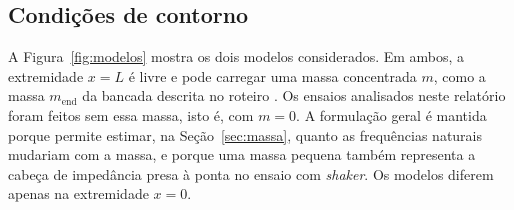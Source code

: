 \subsection{Condições de contorno}
\label{sec:contorno}

A Figura~\ref{fig:modelos} mostra os dois modelos considerados. Em ambos, a
extremidade $x = L$ é livre e pode carregar uma massa concentrada $m$, como a massa
$m_{\mathrm{end}}$ da bancada descrita no roteiro \cite{roteiroLab1}. Os ensaios
analisados neste relatório foram feitos sem essa massa, isto é, com $m = 0$. A
formulação geral é mantida porque permite estimar, na Seção~\ref{sec:massa}, quanto as
frequências naturais mudariam com a massa, e porque uma massa pequena também
representa a cabeça de impedância presa à ponta no ensaio com \emph{shaker}. Os
modelos diferem apenas na extremidade $x = 0$.

